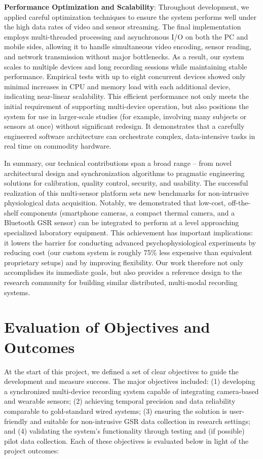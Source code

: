 \textbf{Performance Optimization and Scalability}: Throughout development, we applied careful optimization techniques to ensure the system performs well under the high data rates of video and sensor streaming. The final implementation employs multi-threaded processing and asynchronous I/O on both the PC and mobile sides, allowing it to handle simultaneous video encoding, sensor reading, and network transmission without major bottlenecks. As a result, our system scales to multiple devices and long recording sessions while maintaining stable performance. Empirical tests with up to eight concurrent devices showed only minimal increases in CPU and memory load with each additional device, indicating near-linear scalability. This efficient performance not only meets the initial requirement of supporting multi-device operation, but also positions the system for use in larger-scale studies (for example, involving many subjects or sensors at once) without significant redesign. It demonstrates that a carefully engineered software architecture can orchestrate complex, data-intensive tasks in real time on commodity hardware.

In summary, our technical contributions span a broad range -- from novel architectural design and synchronization algorithms to pragmatic engineering solutions for calibration, quality control, security, and usability. The successful realization of this multi-sensor platform sets new benchmarks for non-intrusive physiological data acquisition. Notably, we demonstrated that low-cost, off-the-shelf components (smartphone cameras, a compact thermal camera, and a Bluetooth GSR sensor) can be integrated to perform at a level approaching specialized laboratory equipment. This achievement has important implications: it lowers the barrier for conducting advanced psychophysiological experiments by reducing cost (our custom system is roughly 75\% less expensive than equivalent proprietary setups) and by improving flexibility. Our work therefore not only accomplishes its immediate goals, but also provides a reference design to the research community for building similar distributed, multi-modal recording systems.

\section{Evaluation of Objectives and Outcomes}

At the start of this project, we defined a set of clear objectives to guide the development and measure success. The major objectives included: (1) developing a synchronized multi-device recording system capable of integrating camera-based and wearable sensors; (2) achieving temporal precision and data reliability comparable to gold-standard wired systems; (3) ensuring the solution is user-friendly and suitable for non-intrusive GSR data collection in research settings; and (4) validating the system's functionality through testing and (if possible) pilot data collection. Each of these objectives is evaluated below in light of the project outcomes:

